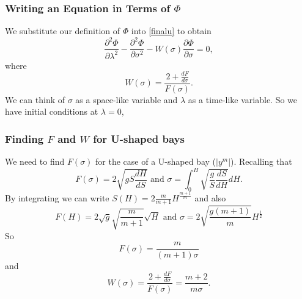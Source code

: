 \begin{frame}
\frametitle{Writing an Equation in Terms of $\Phi$}
We substitute our definition of $\Phi$ into \eqref{finalu} to obtain
\begin{equation}\label{Phieq}
\frac{\partial^2 \Phi}{\partial \lambda^2} - \frac{\partial^2 \Phi}{\partial \sigma^2} - W(\sigma) \frac{\partial \Phi}{\partial \sigma} = 0,
\end{equation}
where
\[
W(\sigma) = \frac{2 + \frac{dF}{d\sigma}}{F(\sigma)}.
\]
We can think of $\sigma$ as a space-like variable and $\lambda$ as a time-like variable. So we have initial conditions at $\lambda = 0$,
\end{frame}


\begin{frame}
\frametitle{Finding $F$ and $W$ for U-shaped bays}
We need to find $F(\sigma)$ for the case of a U-shaped bay ($|y^m|$). Recalling that
\[
F(\sigma)= 2 \sqrt{gS \frac{dH}{dS}} \text{ and } \sigma = \int_0^H \sqrt{\frac{g}{S} \frac{dS}{dH}}dH.
\]
By integrating we can write $S(H)=2\frac{m}{m+1}H^{\frac{m+1}{m}}$ and also
\[
F(H)=2\sqrt{g} \sqrt{\frac{m}{m+1}} \sqrt{H} \text{ and } \sigma=2\sqrt{\frac{g(m+1)}{m}} H^{\frac12}
\]
So
\[F(\sigma)=\frac{m}{(m+1)\sigma}
\]
and
\[
W(\sigma) = \frac{2 + \frac{dF}{d\sigma}}{F(\sigma)}=\frac{m+2}{m\sigma}.
\]

\end{frame}




